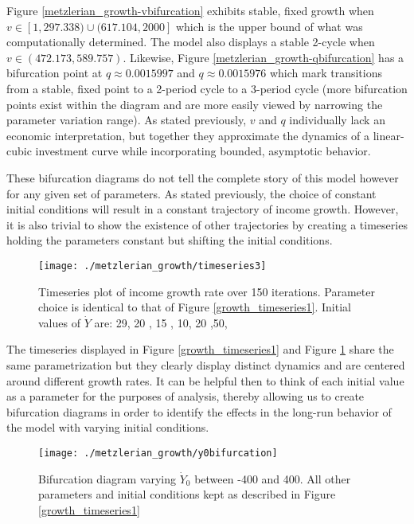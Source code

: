 Figure \ref{metzlerian_growth-vbifurcation} exhibits stable, fixed growth when $v\in[1,297.338)\cup(617.104, 2000]$ which is the upper bound of what was computationally determined. The model also displays a stable 2-cycle when $v\in(472.173, 589.757)$. Likewise, Figure \ref{metzlerian_growth-qbifurcation} has a bifurcation point at $q\approx0.0015997$ and $q\approx0.0015976$ which mark transitions from a stable, fixed point to a 2-period cycle to a 3-period cycle (more bifurcation points exist within the diagram and are more easily viewed by narrowing the parameter variation range). As stated previously, $v$ and $q$ individually lack an economic interpretation, but together they approximate the dynamics of a linear-cubic investment curve while incorporating bounded, asymptotic behavior. 

These bifurcation diagrams do not tell the complete story of this model however for any given set of parameters. As stated previously, the choice of constant initial conditions will result in a constant trajectory of income growth. However, it is also trivial to show the existence of other trajectories by creating a timeseries holding the parameters constant but shifting the initial conditions.
\begin{figure}
    \centering
    \texttt{[image: ./metzlerian\_growth/timeseries3]}
    \caption{Timeseries plot of income growth rate over 150 iterations. Parameter choice is identical to that of Figure \ref{growth_timeseries1}. Initial values of $\dot Y$ are: 29, 20 , 15 , 10, 20 ,50,}
    \label{growth_timeseries3}
\end{figure}

The timeseries displayed in Figure \ref{growth_timeseries1} and Figure \ref{growth_timeseries3} share the same parametrization but they clearly display distinct dynamics and are centered around different growth rates. It can be helpful then to think of each initial value as a parameter for the purposes of analysis, thereby allowing us to create bifurcation diagrams in order to identify the effects in the long-run behavior of the model with varying initial conditions. 

\begin{figure}
    \centering
    \texttt{[image: ./metzlerian\_growth/y0bifurcation]}
    \caption{Bifurcation diagram varying $\dot Y_0$ between -400 and 400. All other parameters and initial conditions kept as described in Figure \ref{growth_timeseries1}}
    \label{metzlerian_growth-y0bifurcation}
\end{figure}

